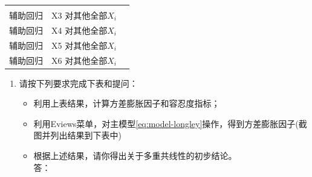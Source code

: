 \documentclass[12pt,(landscape,a4paper),(portrait,a4paper)]{article}
\providecommand{\tightlist}{%
  \setlength{\itemsep}{0pt}\setlength{\parskip}{0pt}}
\begin{document}
\begin{longtable}[]{@{}llc@{}}
\begin{minipage}[t]{0.20\columnwidth}
\strut
\end{minipage}\tabularnewline
\begin{minipage}[t]{0.15\columnwidth}\raggedright
辅助回归\strut
\end{minipage} & \begin{minipage}[t]{0.55\columnwidth}\raggedright
X3 对其他全部\(X_i\)\strut
\end{minipage} & \begin{minipage}[t]{0.20\columnwidth}\centering
\strut
\end{minipage}\tabularnewline
\begin{minipage}[t]{0.15\columnwidth}\raggedright
辅助回归\strut
\end{minipage} & \begin{minipage}[t]{0.55\columnwidth}\raggedright
X4 对其他全部\(X_i\)\strut
\end{minipage} & \begin{minipage}[t]{0.20\columnwidth}\centering
\strut
\end{minipage}\tabularnewline
\begin{minipage}[t]{0.15\columnwidth}\raggedright
辅助回归\strut
\end{minipage} & \begin{minipage}[t]{0.55\columnwidth}\raggedright
X5 对其他全部\(X_i\)\strut
\end{minipage} & \begin{minipage}[t]{0.20\columnwidth}\centering
\strut
\end{minipage}\tabularnewline
\begin{minipage}[t]{0.15\columnwidth}\raggedright
辅助回归\strut
\end{minipage} & \begin{minipage}[t]{0.55\columnwidth}\raggedright
X6 对其他全部\(X_i\)\strut
\end{minipage} & \begin{minipage}[t]{0.20\columnwidth}\centering
\strut
\end{minipage}\tabularnewline
\bottomrule
\end{longtable}

\begin{enumerate}
\def\labelenumi{\alph{enumi}.}
\setcounter{enumi}{4}
\tightlist
\item
  请按下列要求完成下表和提问：

  \begin{itemize}
  \tightlist
  \item
    利用上表结果，计算方差膨胀因子和容忍度指标；
  \item
    利用Eviews菜单，对主模型\eqref{eq:model-longley}操作，得到方差膨胀因子(截图并列出结果到下表中)
  \item
    根据上述结果，请你得出关于多重共线性的初步结论。\\
    答：
  \end{itemize}
\end{enumerate}
\end{document}

